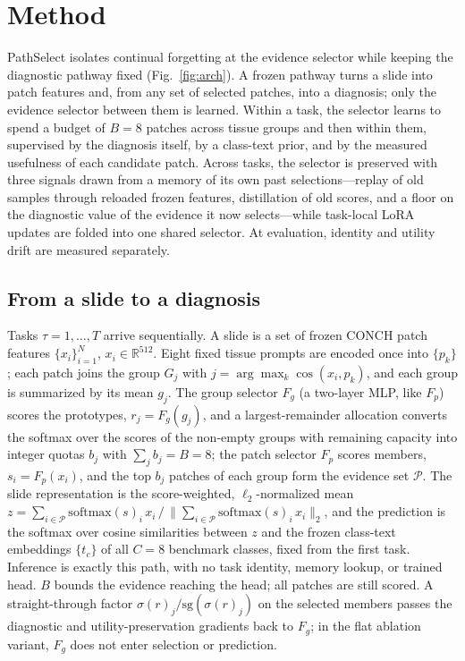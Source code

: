 \documentclass{article}
\newcommand{\Fg}{F_g}
\newcommand{\Fp}{F_p}
\newcommand{\Psel}{\mathcal{P}}
\begin{document}
\section{Method}
\label{sec:method}

PathSelect isolates continual forgetting at the evidence selector while keeping the diagnostic pathway fixed (Fig.~\ref{fig:arch}). A frozen pathway turns a slide into patch features and, from any set of selected patches, into a diagnosis; only the evidence selector between them is learned. Within a task, the selector learns to spend a budget of $B=8$ patches across tissue groups and then within them, supervised by the diagnosis itself, by a class-text prior, and by the measured usefulness of each candidate patch. Across tasks, the selector is preserved with three signals drawn from a memory of its own past selections---replay of old samples through reloaded frozen features, distillation of old scores, and a floor on the diagnostic value of the evidence it now selects---while task-local LoRA updates are folded into one shared selector. At evaluation, identity and utility drift are measured separately.

\subsection{From a slide to a diagnosis}
\label{ssec:setup}

Tasks $\tau=1,\ldots,T$ arrive sequentially. A slide is a set of frozen CONCH patch features $\{x_i\}_{i=1}^{N}$, $x_i\in\mathbb{R}^{512}$. Eight fixed tissue prompts are encoded once into $\{p_k\}$; each patch joins the group $G_j$ with $j=\arg\max_k\cos(x_i,p_k)$, and each group is summarized by its mean $g_j$. The group selector $\Fg$ (a two-layer MLP, like $\Fp$) scores the prototypes, $r_j=\Fg(g_j)$, and a largest-remainder allocation converts the softmax over the scores of the non-empty groups with remaining capacity into integer quotas $b_j$ with $\sum_j b_j=B=8$; the patch selector $\Fp$ scores members, $s_i=\Fp(x_i)$, and the top $b_j$ patches of each group form the evidence set $\Psel$. The slide representation is the score-weighted, $\ell_2$-normalized mean $z=\sum_{i\in\Psel}\mathrm{softmax}(s)_i\,x_i\,/\,\bigl\|\sum_{i\in\Psel}\mathrm{softmax}(s)_i\,x_i\bigr\|_2$, and the prediction is the softmax over cosine similarities between $z$ and the frozen class-text embeddings $\{t_c\}$ of all $C=8$ benchmark classes, fixed from the first task. Inference is exactly this path, with no task identity, memory lookup, or trained head. $B$ bounds the evidence reaching the head; all patches are still scored. A straight-through factor $\sigma(r)_j/\mathrm{sg}(\sigma(r)_j)$ on the selected members passes the diagnostic and utility-preservation gradients back to $\Fg$; in the flat ablation variant, $\Fg$ does not enter selection or prediction.
\end{document}
